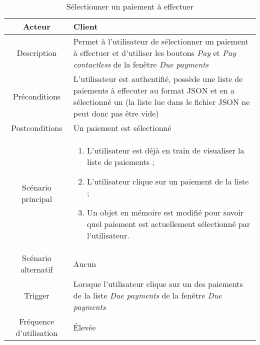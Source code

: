 \documentclass{article}
\begin{document}
\begin{table}

\begin{tabular}{|c|p{11cm}|}
\hline
Acteur & Client \\
\hline
Description & Permet à l'utilisateur de sélectionner un paiement à effectuer et d'utiliser les boutons \emph{Pay} et \emph{Pay contactless} de la fenêtre \emph{Due payments} \\
\hline
Préconditions & L'utilisateur est authentifié, possède une liste de paiements à effecuter au format JSON et en a sélectionné un (la liste lue dans le fichier JSON ne peut donc pas être vide) \\
\hline
Postconditions & Un paiement est sélectionné \\
\hline
Scénario principal & \begin{enumerate}
\item L'utilisateur est déjà en train de visualiser la liste de paiements ;
\item L'utilisateur clique sur un paiement de la liste ;
\item Un objet en mémoire est modifié pour savoir quel paiement est actuellement sélectionné par l'utilisateur.
\end{enumerate} \\
\hline
Scénario alternatif & Aucun \\
\hline
Trigger & Lorsque l'utilisateur clique sur un des paiements de la liste \emph{Due payments} de la fenêtre \emph{Due payments} \\
\hline
Fréquence d'utilisation & Élevée \\
\hline
\end{tabular}

\caption{Sélectionner un paiement à effectuer}

\end{table}
\end{document}

